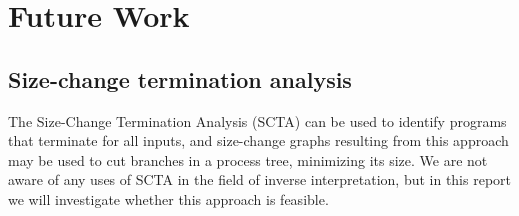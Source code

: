 \documentclass[10pt]{../sigplanconf}
\begin{document}
\section{Future Work}
\subsection{Size-change termination analysis}
  The Size-Change Termination Analysis (SCTA)\cite{lee2001size} can be
  used to identify programs that terminate for all inputs, and
  size-change graphs resulting from this approach may be used to cut
  branches in a process tree, minimizing its size. We are not aware of
  any uses of SCTA in the field of inverse interpretation, but in this
  report we will investigate whether this approach is feasible.






\appendix
\end{document}
